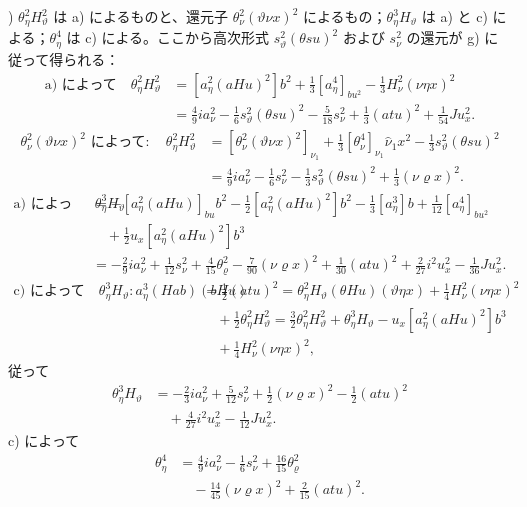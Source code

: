 \documentclass[11pt]{jlreq}
\newcommand{\R}{\varrho}
\begin{document}
) $\theta_\eta^2H_\vartheta^2$ は a) によるものと、還元子 $\theta_\nu^2(\vartheta\nu x)^2$ によるもの；$\theta_\eta^3H_\vartheta$ は a) と c) による；$\theta_\eta^4$ は c) による。ここから高次形式 $s_\vartheta^2(\theta su)^2$ および $s_\nu^2$ の還元が g) に従って得られる：
\[
\begin{aligned}
\text{a) によって}\quad
\theta_\eta^2H_\vartheta^2&=[a_\eta^2(aHu)^2]b^2+\frac13[a_\eta^4]_{bu^2}-\frac13H_\nu^2(\nu\eta x)^2\\
&=\frac49ia_\nu^2-\frac16s_\vartheta^2(\theta su)^2-\frac5{18}s_\nu^2+\frac13(atu)^2+\frac1{54}Ju_x^2.
\end{aligned}
\]
\[
\begin{aligned}
\theta_\nu^2(\vartheta\nu x)^2\text{ によって}:
\quad\theta_\eta^2H_\vartheta^2
&=[\theta_\nu^2(\vartheta\nu x)^2]_{\nu_1}+\frac13[\theta_\nu^4]_{\nu_1}\hat\nu_1x^2-\frac13s_\vartheta^2(\theta su)^2\\
&=\frac49ia_\nu^2-\frac16s_\nu^2-\frac13s_\vartheta^2(\theta su)^2+\frac13(\nu\R x)^2.
\end{aligned}
\]
\[
\begin{aligned}
\text{a) によって}\quad
\theta_\eta^3H_\vartheta&=-[a_\eta^2(aHu)]_{bu}b^2-\frac12[a_\eta^2(aHu)^2]b^2-\frac13[a_\eta^3]b+\frac1{12}[a_\eta^4]_{bu^2}\\
&\quad+\frac12u_x[a_\eta^2(aHu)^2]b^3\\
&=-\frac29ia_\nu^2+\frac1{12}s_\nu^2+\frac4{15}\theta_\R^2-\frac7{90}(\nu\R x)^2+\frac1{30}(atu)^2+\frac2{27}i^2u_x^2-\frac1{36}Ju_x^2.
\end{aligned}
\]
\[
\begin{aligned}
\text{c) によって}\quad
\theta_\eta^3H_\vartheta:
 a_\eta^3(Hab)(bHu)&=\frac12(atu)^2
=\theta_\eta^2H_\vartheta(\theta Hu)(\vartheta\eta x)+\frac14H_\nu^2(\nu\eta x)^2\\
&\quad+\frac12\theta_\eta^2H_\vartheta^2
=\frac32\theta_\eta^2H_\vartheta^2+\theta_\eta^3H_\vartheta-u_x[a_\eta^2(aHu)^2]b^3\\
&\quad+\frac14H_\nu^2(\nu\eta x)^2,
\end{aligned}
\]
従って
\[
\begin{aligned}
\theta_\eta^3H_\vartheta&=-\frac23ia_\nu^2+\frac5{12}s_\nu^2+\frac12(\nu\R x)^2-\frac12(atu)^2\\
&\quad+\frac4{27}i^2u_x^2-\frac1{12}Ju_x^2.
\end{aligned}
\]
c) によって
\[
\begin{aligned}
\theta_\eta^4&=\frac49ia_\nu^2-\frac16s_\nu^2+\frac{16}{15}\theta_\R^2\\
&\quad-\frac{14}{45}(\nu\R x)^2+\frac2{15}(atu)^2.
\end{aligned}
\]
\end{document}
